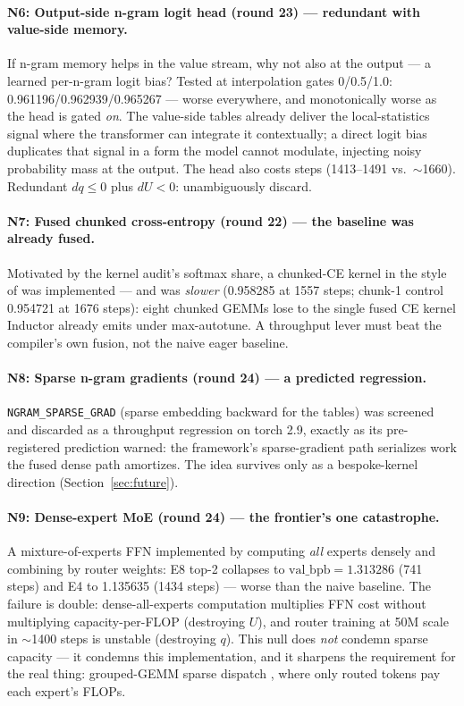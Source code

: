\documentclass{article}
\newcommand{\valbpb}{\mathrm{val\_bpb}}
\begin{document}
\paragraph{N6: Output-side n-gram logit head (round 23) --- redundant with value-side memory.}
If n-gram memory helps in the value stream, why not also at the output --- a learned per-n-gram logit bias? Tested at interpolation gates 0/0.5/1.0: 0.961196/0.962939/0.965267 --- worse everywhere, and monotonically worse as the head is gated \emph{on}. The value-side tables already deliver the local-statistics signal where the transformer can integrate it contextually; a direct logit bias duplicates that signal in a form the model cannot modulate, injecting noisy probability mass at the output. The head also costs steps (1413--1491 vs.\ $\sim$1660). Redundant $dq \leq 0$ plus $dU < 0$: unambiguously discard.

\paragraph{N7: Fused chunked cross-entropy (round 22) --- the baseline was already fused.}
Motivated by the kernel audit's softmax share, a chunked-CE kernel in the style of \citet{hsu2024liger} was implemented --- and was \emph{slower} (0.958285 at 1557 steps; chunk-1 control 0.954721 at 1676 steps): eight chunked GEMMs lose to the single fused CE kernel Inductor already emits under max-autotune. A throughput lever must beat the compiler's own fusion, not the naive eager baseline.

\paragraph{N8: Sparse n-gram gradients (round 24) --- a predicted regression.}
\texttt{NGRAM\_SPARSE\_GRAD} (sparse embedding backward for the tables) was screened and discarded as a throughput regression on torch 2.9, exactly as its pre-registered prediction warned: the framework's sparse-gradient path serializes work the fused dense path amortizes. The idea survives only as a bespoke-kernel direction (Section~\ref{sec:future}).

\paragraph{N9: Dense-expert MoE (round 24) --- the frontier's one catastrophe.}
A mixture-of-experts FFN implemented by computing \emph{all} experts densely and combining by router weights: E8 top-2 collapses to $\valbpb = 1.313286$ (741 steps) and E4 to 1.135635 (1434 steps) --- worse than the naive baseline. The failure is double: dense-all-experts computation multiplies FFN cost without multiplying capacity-per-FLOP (destroying $U$), and router training at 50M scale in $\sim$1400 steps is unstable (destroying $q$). This null does \emph{not} condemn sparse capacity --- it condemns this implementation, and it sharpens the requirement for the real thing: grouped-GEMM sparse dispatch \cite{fedus2022switch}, where only routed tokens pay each expert's FLOPs.
\end{document}
